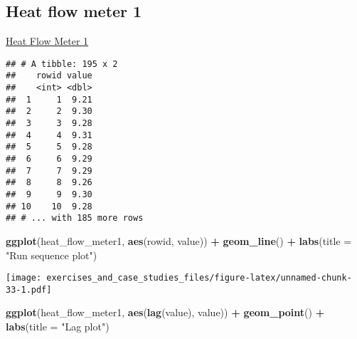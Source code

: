 \documentclass[]{book}
\newenvironment{Shaded}{\begin{snugshade}}{\end{snugshade}}
\newcommand{\DataTypeTok}[1]{\textcolor[rgb]{0.13,0.29,0.53}{#1}}
\newcommand{\DecValTok}[1]{\textcolor[rgb]{0.00,0.00,0.81}{#1}}
\newcommand{\KeywordTok}[1]{\textcolor[rgb]{0.13,0.29,0.53}{\textbf{#1}}}
\newcommand{\NormalTok}[1]{#1}
\newcommand{\OperatorTok}[1]{\textcolor[rgb]{0.81,0.36,0.00}{\textbf{#1}}}
\newcommand{\StringTok}[1]{\textcolor[rgb]{0.31,0.60,0.02}{#1}}
\theoremstyle{definition}
\theoremstyle{definition}
\theoremstyle{definition}
\theoremstyle{remark}
\begin{document}
\hypertarget{heat-flow-meter-1}{%
\subsection{Heat flow meter 1}\label{heat-flow-meter-1}}

\href{https://www.itl.nist.gov/div898/handbook/eda/section4/eda428.htm}{Heat
Flow Meter 1}

\begin{Shaded}
\end{Shaded}

\begin{verbatim}
## # A tibble: 195 x 2
##    rowid value
##    <int> <dbl>
##  1     1  9.21
##  2     2  9.30
##  3     3  9.28
##  4     4  9.31
##  5     5  9.28
##  6     6  9.29
##  7     7  9.29
##  8     8  9.26
##  9     9  9.30
## 10    10  9.28
## # ... with 185 more rows
\end{verbatim}

\begin{Shaded}
\begin{Highlighting}[]
\KeywordTok{ggplot}\NormalTok{(heat_flow_meter1, }\KeywordTok{aes}\NormalTok{(rowid, value)) }\OperatorTok{+}
\StringTok{  }\KeywordTok{geom_line}\NormalTok{() }\OperatorTok{+}
\StringTok{  }\KeywordTok{labs}\NormalTok{(}\DataTypeTok{title =} \StringTok{"Run sequence plot"}\NormalTok{)}
\end{Highlighting}
\end{Shaded}

\texttt{[image: exercises\_and\_case\_studies\_files/figure-latex/unnamed-chunk-33-1.pdf]}

\begin{Shaded}
\begin{Highlighting}[]
\KeywordTok{ggplot}\NormalTok{(heat_flow_meter1, }\KeywordTok{aes}\NormalTok{(}\KeywordTok{lag}\NormalTok{(value), value)) }\OperatorTok{+}
\StringTok{  }\KeywordTok{geom_point}\NormalTok{() }\OperatorTok{+}
\StringTok{  }\KeywordTok{labs}\NormalTok{(}\DataTypeTok{title =} \StringTok{"Lag plot"}\NormalTok{)}
\end{Highlighting}
\end{Shaded}
\end{document}
